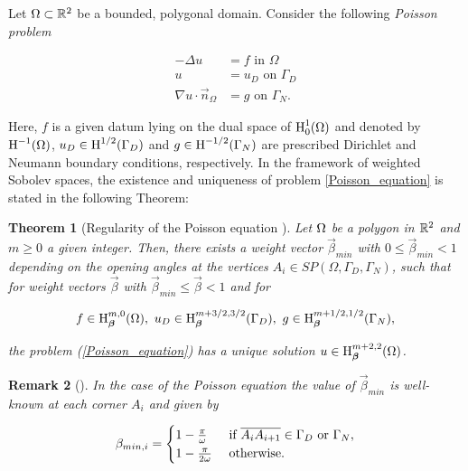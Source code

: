 \documentclass[a4paper,11pt]{article}
\newtheorem{theorem}{Theorem}
\newtheorem{remark}[theorem]{Remark}
\begin{document}
{Let $\Omega \subset \mathbb R^{2}$ be a bounded, polygonal domain. Consider the following \textit{Poisson problem}

\begin{equation}\label{Poisson_equation}
\begin{split}
 - \Delta u &  = f  \text{ in } \Omega \\
u &  = u_{D} \text{ on } \Gamma_{D}\\
\nabla u \cdot \vec{n}_{\Omega} & = g \text{ on } \Gamma_{N}.
\end{split}
\end{equation}

Here, $f$ is a given datum lying on the dual space of $\operatorname H^{1}_0(\Omega)$ and denoted by $\operatorname H^{-1}(\Omega)$, $u_{D} \in \operatorname H^{1/2}(\Gamma_{D})$ and $ g \in \operatorname H^{-1/2}(\Gamma_{N})$ are prescribed Dirichlet and Neumann boundary conditions, respectively. In the framework of weighted Sobolev spaces, the existence and uniqueness of problem \eqref{Poisson_equation} is stated in the following Theorem:

\begin{theorem}[Regularity of the Poisson equation {\cite[Theorem 3.1]{BG:1988}}] \label{thm:regularity}
Let $\Omega$ be a polygon in $\mathbb R^2$ and $m \geq 0$ a given integer. Then, there exists a weight vector $\vec{\beta}_{min}$ with $0 \leq \vec{\beta}_{min} < 1$ depending on the opening angles at the vertices $A_{i} \in  \textit{SP}(\Omega,\Gamma_{D},\Gamma_{N})$, such that for weight vectors $\vec{\beta}$ with $\vec{\beta}_{min} \leq \vec{\beta} < 1$ and for 

$$ f \in  \operatorname H^{m,0}_{\boldsymbol \beta}(\Omega), \ u_{D} \in \operatorname H^{m + 3/2,3/2}_{\boldsymbol \beta}(\Gamma_{D}), \ g \in \operatorname H^{m+1/2,1/2}_{\boldsymbol \beta}(\Gamma_{N}),$$

the problem (\ref{Poisson_equation}) has a unique solution $u \in \operatorname H^{m+2,2}_{\boldsymbol \beta}(\Omega)$.    
\end{theorem}


\begin{remark}[{\cite[Theorem 2.1 - Remark 3]{BG:1988}}]
\label{remark:beta_value}
In the case of the Poisson equation the value of $\vec{\beta}_{min}$ is well-known at each corner $A_{i}$ and given by

\begin{equation}
    \beta_{min,i} = 
    \begin{cases}
        1 - \frac{\pi}{\omega} & \text{ if }  \overline{A_{i}A_{i+1}} \in \Gamma_{D} \text{ or }  \Gamma_{N},\\
        1 - \frac{\pi}{2\omega} & \text{ otherwise}.
    \end{cases}
\end{equation}
\end{remark}

}
\end{document}
